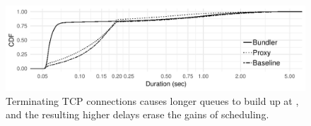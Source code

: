\begin{figure}
    \centering
\begin{knitrout}
\color{fgcolor}
\includegraphics[width=\maxwidth]{figure/eval:proxy-1} 

\end{knitrout}
    \caption{Terminating TCP connections causes longer queues to build up at \inbox, and the resulting higher delays erase the gains of scheduling.}
    \label{fig:eval:proxy}
\end{figure}
